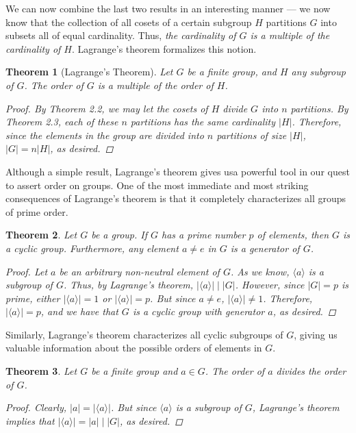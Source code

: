 \documentclass[openany, amssymb, psamsfonts]{amsart}
\newtheorem{thm}{Theorem}[section]
\theoremstyle{definition}
\numberwithin{equation}{section}
\begin{document}
We can now combine the last two results in an interesting manner --- we now know that the collection of all cosets of a certain subgroup $H$ partitions $G$ into subsets all of equal cardinality. Thus, \emph{the cardinality of $G$ is a multiple of the cardinality of $H$}. Lagrange's theorem formalizes this notion.
\begin{thm}[Lagrange's Theorem]
    Let $G$ be a finite group, and $H$ any subgroup of $G$. The order of $G$ is a multiple of the order of $H$.
    \begin{proof}
        By Theorem 2.2, we may let the cosets of $H$ divide $G$ into $n$ partitions. By Theorem 2.3, each of these $n$ partitions has the same cardinality $|H|$. Therefore, since the elements in the group are divided into $n$ partitions of size $|H|$, $|G|=n|H|$, as desired.
    \end{proof}
\end{thm}\par
Although a simple result, Lagrange's theorem gives usa  powerful tool in our quest to assert order on groups. One of the most immediate and most striking consequences of Lagrange's theorem is that it completely characterizes all groups of prime order.
\begin{thm}
    Let $G$ be a group. If $G$ has a prime number $p$ of elements, then $G$ is a cyclic group. Furthermore, any element $a\neq e$ in $G$ is a generator of $G$.
    \begin{proof}
        Let $a$ be an arbitrary non-neutral element of $G$. As we know, $\langle a\rangle$ is a subgroup of $G$. Thus, by Lagrange's theorem, $|\langle a\rangle|\mid|G|$. However, since $|G|=p$ is prime, either $|\langle a\rangle|=1$ or $|\langle a\rangle|=p$. But since $a\neq e$, $|\langle a\rangle|\neq 1$. Therefore, $|\langle a\rangle|=p$, and we have that $G$ is a cyclic group with generator $a$, as desired.
    \end{proof}
\end{thm}
Similarly, Lagrange's theorem characterizes all cyclic subgroups of $G$, giving us valuable information about the possible orders of elements in $G$.
\begin{thm}
    Let $G$ be a finite group and $a\in G$. The order of $a$ divides the order of $G$.
    \begin{proof}
        Clearly, $|a|=|\langle a\rangle|$. But since $\langle a\rangle$ is a subgroup of $G$, Lagrange's theorem implies that $|\langle a\rangle|=|a|\mid|G|$, as desired.
    \end{proof}
\end{thm}
\end{document}
